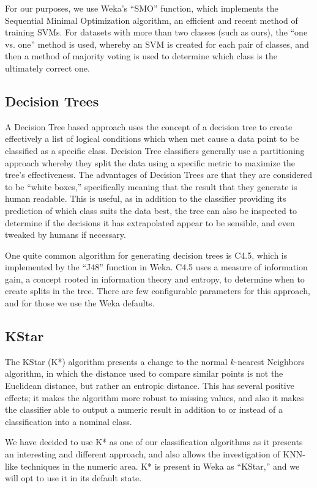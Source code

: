 \documentclass[../thesis/thesis.tex]{subfiles}
\begin{document}
For our purposes, we use Weka's ``SMO'' function, which implements the Sequential Minimal Optimization algorithm, an efficient and recent method of training SVMs. For datasets with more than two classes (such as ours), the ``one vs. one'' method is used, whereby an SVM is created for each pair of classes, and then a method of majority voting is used to determine which class is the ultimately correct one. %

\subsection{Decision Trees}
A Decision Tree based approach uses the concept of a decision tree to create effectively a list of logical conditions which when met cause a data point to be classified as a specific class. Decision Tree classifiers generally use a partitioning approach whereby they split the data using a specific metric to maximize the tree's effectiveness. The advantages of Decision Trees are that they are considered to be ``white boxes,'' specifically meaning that the result that they generate is human readable. This is useful, as in addition to the classifier providing its prediction of which class suits the data best, the tree can also be inspected to determine if the decisions it has extrapolated appear to be sensible, and even tweaked by humans if necessary.

One quite common algorithm for generating decision trees is C4.5, which is implemented by the ``J48'' function in Weka. C4.5 uses a measure of information gain, a concept rooted in information theory and entropy, to determine when to create splits in the tree. There are few configurable parameters for this approach, and for those we use the Weka defaults.

\subsection{KStar}
The KStar (K*) algorithm presents a change to the normal $k$-nearest Neighbors algorithm, in which the distance used to compare similar points is not the Euclidean distance, but rather an entropic distance. This has several positive effects; it makes the algorithm more robust to missing values, and also it makes the classifier able to output a numeric result in addition to or instead of a classification into a nominal class.

We have decided to use K* as one of our classification algorithms as it presents an interesting and different approach, and also allows the investigation of KNN-like techniques in the numeric area. K* is present in Weka as ``KStar,'' and we will opt to use it in its default state.
\end{document}
